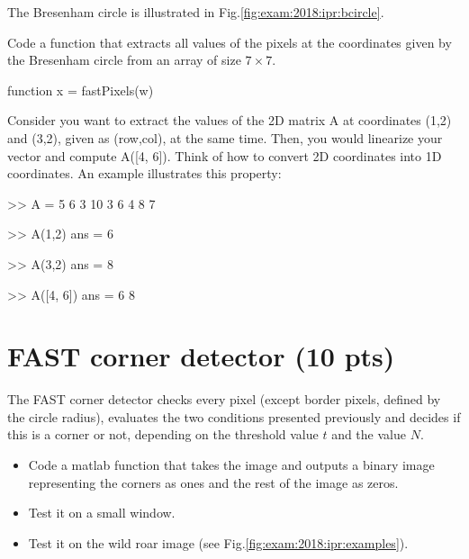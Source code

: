 The Bresenham circle is illustrated in Fig.\ref{fig:exam:2018:ipr:bcircle}.

 \begin{qbox}
  Code a function that extracts all values of the pixels at the coordinates given by the Bresenham circle from an array  of size $7\times 7$.
  
  \begin{matlab}
   function x = fastPixels(w)
  \end{matlab}

 \end{qbox}


 \begin{mcomment}
\begin{mremark}
 Consider you want to extract the values of the 2D matrix A at coordinates (1,2) and (3,2), given as (row,col), at the same time. 
  Then, you would linearize your vector and compute A([4, 6]). Think of how to convert 2D coordinates into 1D coordinates. An example illustrates this property:
  \begin{matlab}
>> A =
     5     6     3
    10     3     6
     4     8     7

>> A(1,2)
ans =
     6

>> A(3,2)
ans =
     8
     
>> A([4, 6])
ans =
     6     8
\end{matlab}
 
 \end{mremark}
\end{mcomment}


\section{FAST corner detector (10 pts)}
The FAST corner detector checks every pixel (except border pixels, defined by the circle radius), evaluates the two conditions presented previously and decides if this is a corner or not, depending on the threshold value $t$ and the value $N$.

\begin{qbox}
\begin{itemize}
 \item 
 Code a matlab function that takes the image  and outputs a binary image representing the corners as ones and the rest of the image as zeros.
 \item Test it on a small window.
 \item Test it on the wild roar image (see Fig.\ref{fig:exam:2018:ipr:examples}).
\end{itemize}

\end{qbox}

